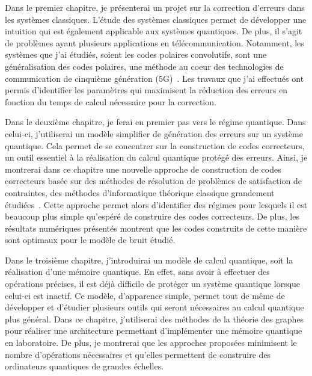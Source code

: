 Dans le premier chapitre,
je présenterai un projet sur la correction d'erreurs dans les systèmes classiques.
L'étude des systèmes classiques permet de développer une intuition qui est également
applicable aux systèmes quantiques.
De plus, il s'agit de problèmes ayant plusieurs applications en télécommunication.
Notamment,
les systèmes que j'ai étudiés,
soient les codes polaires convolutifs,
sont une généralisation des codes polaires,
une méthode au coeur des technologies de communication de cinquième génération (5G)~\cite{arikan_rate_2009, bioglio_design_2021}.
Les travaux que j'ai effectués ont permis d'identifier les paramètres qui maximisent la réduction des erreurs
en fonction du temps de calcul nécessaire pour la correction.

Dans le deuxième chapitre,
je ferai en premier pas vers le régime quantique.
Dans celui-ci,
j'utiliserai un modèle simplifier de génération des erreurs sur un système quantique.
Cela permet de se concentrer sur la construction de codes correcteurs,
un outil essentiel à la réalisation du calcul quantique protégé des erreurs.
Ainsi,
je montrerai dans ce chapitre une nouvelle approche de construction de codes correcteurs
basée sur des méthodes de résolution de problèmes de satisfaction de contraintes,
des méthodes d'informatique théorique classique grandement étudiées~\cite{arora_computational_2009, noauthor_minizinc_nodate, noauthor_sat_nodate, achlioptas_rigorous_2005}.
Cette approche permet alors d'identifier des régimes pour lesquels il est beaucoup plus simple qu'espéré
de construire des codes correcteurs.
De plus,
les résultats numériques présentés montrent que les codes construits de cette manière
sont optimaux pour le modèle de bruit étudié.

Dans le troisième chapitre,
j'introduirai un modèle de calcul quantique,
soit la réalisation d'une mémoire quantique.
En effet,
sans avoir à effectuer des opérations précises,
il est déjà difficile de protéger un système quantique lorsque celui-ci est inactif.
Ce modèle,
d'apparence simple,
permet tout de même de développer et d'étudier plusieurs outils qui seront nécessaires
au calcul quantique plus général.
Dans ce chapitre,
j'utiliserai des méthodes de la théorie des graphes pour réaliser une architecture 
permettant d'implémenter une mémoire quantique en laboratoire.
De plus,
je montrerai que les approches proposées minimisent le nombre d'opérations nécessaires
et qu'elles permettent de construire des ordinateurs quantiques de grandes échelles.

